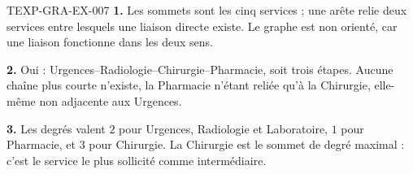 \begin{corrige}{TEXP-GRA-EX-007}
\textbf{1.} Les sommets sont les cinq services ; une arête relie deux services
entre lesquels une liaison directe existe. Le graphe est non orienté, car une
liaison fonctionne dans les deux sens.

\textbf{2.} Oui : Urgences--Radiologie--Chirurgie--Pharmacie, soit trois
étapes. Aucune chaîne plus courte n'existe, la Pharmacie n'étant reliée qu'à
la Chirurgie, elle-même non adjacente aux Urgences.

\textbf{3.} Les degrés valent $2$ pour Urgences, Radiologie et Laboratoire,
$1$ pour Pharmacie, et $3$ pour Chirurgie. La Chirurgie est le sommet de degré
maximal : c'est le service le plus sollicité comme intermédiaire.
\end{corrige}
